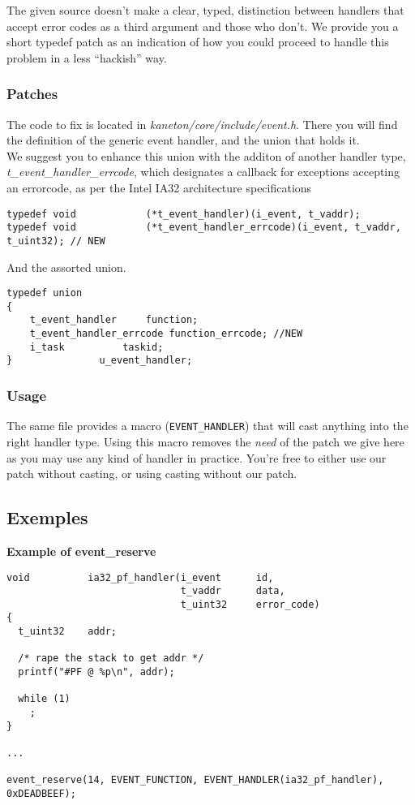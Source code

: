 The given source doesn't make a clear, typed, distinction between
handlers that accept error codes as a third argument and those who
don't. We provide you a short typedef patch as an indication of
how you could proceed to handle this problem in a less ``hackish''
way.

\subsubsection*{Patches}

The code to fix is located in \textit{kaneton/core/include/event.h}.
There you will find the definition of the generic event handler,
and the union that holds it. \\

We suggest you to enhance this union with the additon of another
handler type, \textit{t\_event\_handler\_errcode}, which designates a
callback for exceptions accepting an errorcode, as per the Intel IA32
architecture specifications

\begin{verbatim}
typedef void			(*t_event_handler)(i_event, t_vaddr);
typedef void			(*t_event_handler_errcode)(i_event, t_vaddr, t_uint32); // NEW
\end{verbatim}

And the assorted union.
\begin{verbatim}
typedef union
{
    t_event_handler		function;
    t_event_handler_errcode	function_errcode; //NEW
    i_task			taskid;
}				u_event_handler;
\end{verbatim}

\subsubsection*{Usage}
The same file provides a macro (\texttt{EVENT\_HANDLER}) that will cast
anything into the right handler type. Using this macro removes the
\textit{need} of the patch we give here as you may use any kind of
handler in practice. You're free to either use our patch without
casting, or using casting without our patch.

\newpage
\subsection{Exemples}

\textbf{Example of event\_reserve}

\begin{verbatim}
void          ia32_pf_handler(i_event      id,
                              t_vaddr      data,
                              t_uint32     error_code)
{
  t_uint32    addr;

  /* rape the stack to get addr */
  printf("#PF @ %p\n", addr);

  while (1)
    ;
}

...

event_reserve(14, EVENT_FUNCTION, EVENT_HANDLER(ia32_pf_handler), 0xDEADBEEF);
\end{verbatim}

